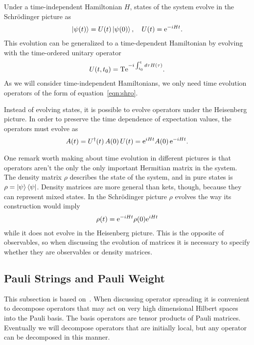 Under a time-independent Hamiltonian $H$, states of the system evolve in the Schr\"odinger picture as 
\begin{align}
\left|\psi(t)\right\rangle = U(t)\left|\psi(0)\right\rangle,\quad U(t) = \text{e}^{-iHt}. \label{eqn:shro}
\end{align}
This evolution can be generalized to a time-dependent Hamiltonian by evolving with the time-ordered unitary operator
\begin{align}
U(t,t_0) = \text{T}\text{e}^{-i\int_{t_0}^td\tau H(\tau)}.\nonumber
\end{align}
As we will consider time-independent Hamiltonians, we only need time evolution operators of the form of equation~\ref{eqn:shro}. 

Instead of evolving states, it is possible to evolve operators under the Heisenberg picture. In order to preserve the time dependence of expectation values, the operators must evolve as 
\begin{align}
A(t) = U^\dag(t)\,A(0)\,U(t) = \text{e}^{iHt}A(0)\,\text{e}^{-iHt}.\label{eqn:heis}
\end{align}

One remark worth making about time evolution in different pictures is that operators aren't the only the only important Hermitian matrix in the system. The density matrix $\rho$ describes the state of the system, and in pure states is $\rho = \left|\psi\right\rangle\left\langle\psi\right|$. Density matrices are more general than kets, though, because they can represent mixed states. In the Schr\"odinger picture $\rho$ evolves the way its construction would imply
\begin{align}
\rho(t) = \text{e}^{-iHt}\rho(0)\text{e}^{iHt}
\end{align}
while it does not evolve in the Heisenberg picture. This is the opposite of observables, so when discussing the evolution of matrices it is necessary to specify whether they are observables or density matrices.

\subsection{Pauli Strings and Pauli Weight} \label{sub:pauli}

This subsection is based on~\cite{Keyserlingk}. When discussing operator spreading it is convenient to decompose operators that may act on very high dimensional Hilbert spaces into the Pauli basis. The basis operators are tensor products of Pauli matrices. Eventually we will decompose operators that are initially local, but any operator can be decomposed in this manner.

